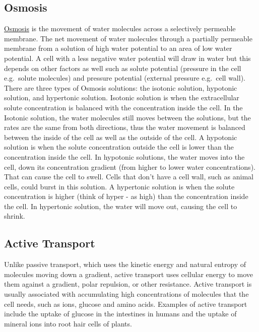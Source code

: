 \hypertarget{osmosis}{%
\subsection{Osmosis}\label{osmosis}}

\href{https://en.wikipedia.org/wiki/Osmosis}{Osmosis} is the movement of water molecules across a selectively permeable membrane. The net movement of water molecules through a partially permeable membrane from a solution of high water potential to an area of low water potential. A cell with a less negative water potential will draw in water but this depends on other factors as well such as solute potential (pressure in the cell e.g.~solute molecules) and pressure potential (external pressure e.g.~cell wall). There are three types of Osmosis solutions: the isotonic solution, hypotonic solution, and hypertonic solution. Isotonic solution is when the extracellular solute concentration is balanced with the concentration inside the cell. In the Isotonic solution, the water molecules still moves between the solutions, but the rates are the same from both directions, thus the water movement is balanced between the inside of the cell as well as the outside of the cell. A hypotonic solution is when the solute concentration outside the cell is lower than the concentration inside the cell. In hypotonic solutions, the water moves into the cell, down its concentration gradient (from higher to lower water concentrations). That can cause the cell to swell. Cells that don't have a cell wall, such as animal cells, could burst in this solution. A hypertonic solution is when the solute concentration is higher (think of hyper - as high) than the concentration inside the cell. In hypertonic solution, the water will move out, causing the cell to shrink.

\hypertarget{active-transport}{%
\subsection{Active Transport}\label{active-transport}}

Unlike passive transport, which uses the kinetic energy and natural entropy of molecules moving down a gradient, active transport uses cellular energy to move them against a gradient, polar repulsion, or other resistance. Active transport is usually associated with accumulating high concentrations of molecules that the cell needs, such as ions, glucose and amino acids. Examples of active transport include the uptake of glucose in the intestines in humans and the uptake of mineral ions into root hair cells of plants.

